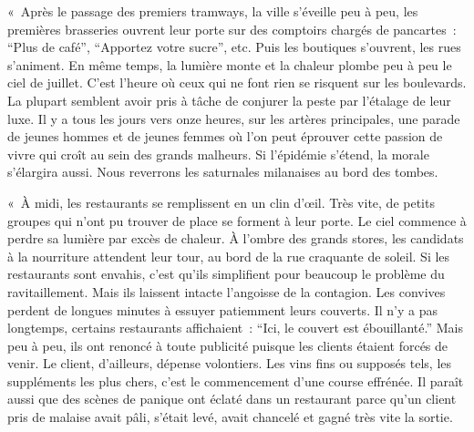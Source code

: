 \documentclass[french,twoside]{book} %
\begin{document}
« Après le passage des premiers tramways, la ville s’éveille peu à peu, les premières brasseries ouvrent leur porte sur des comptoirs chargés de pancartes : “Plus de café”, “Apportez votre sucre”, etc. Puis les boutiques s’ouvrent, les rues s’animent. En même temps, la lumière monte et la chaleur plombe peu à peu le ciel de juillet. C’est l’heure où ceux qui ne font rien se risquent sur les boulevards. La plupart semblent avoir pris à tâche de conjurer la peste par l’étalage de leur luxe. Il y a tous les jours vers onze heures, sur les artères principales, une parade de jeunes hommes et de jeunes femmes où l’on peut éprouver cette passion de vivre qui croît au sein des grands malheurs. Si l’épidémie s’étend, la morale s’élargira aussi. Nous reverrons les saturnales milanaises au bord des tombes.\par
« À midi, les restaurants se remplissent en un clin d’œil. Très vite, de petits groupes qui n’ont pu trouver de place se forment à leur porte. Le ciel commence à perdre sa lumière par excès de chaleur. À l’ombre des grands stores, les candidats à la nourriture attendent leur tour, au bord de la rue craquante de soleil. Si les restaurants sont envahis, c’est qu’ils simplifient pour beaucoup le problème du ravitaillement. Mais ils laissent intacte l’angoisse de la contagion. Les convives perdent de longues minutes à essuyer patiemment leurs couverts. Il n’y a pas longtemps, certains restaurants affichaient : “Ici, le couvert est ébouillanté.” Mais peu à peu, ils ont renoncé à toute publicité puisque les clients étaient forcés de venir. Le client, d’ailleurs, dépense volontiers. Les vins fins ou supposés tels, les suppléments les plus chers, c’est le commencement d’une course effrénée. Il paraît aussi que des scènes de panique ont éclaté dans un restaurant parce qu’un client pris de malaise avait pâli, s’était levé, avait chancelé et gagné très vite la sortie.\par
\end{document}
